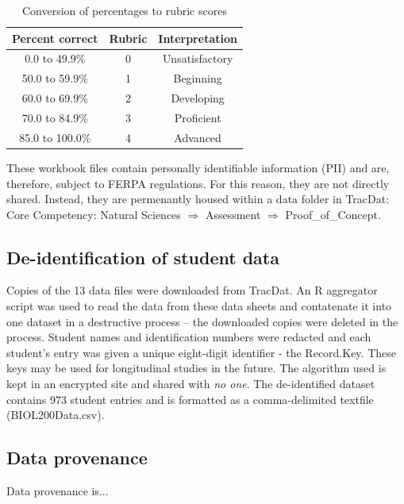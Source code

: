 \documentclass[fleqn,10pt]{SelfArx}\usepackage[]{graphicx}\usepackage[]{color}
\begin{document}
\begin{table}[hbt]
\caption{Conversion of percentages to rubric scores}
\centering
\begin{tabular}{c c c}
\textbf{Percent correct} & \textbf{Rubric} & \textbf{Interpretation}   \\
\hline
 0.0 to 49.9\%   &   0   &   Unsatisfactory                                \\
50.0 to 59.9\%   &   1   &   Beginning                                     \\
60.0 to 69.9\%   &   2   &   Developing                                    \\
70.0 to 84.9\%   &   3   &   Proficient                                    \\
85.0 to 100.0\%  &   4   &   Advanced                                      \\
\end{tabular}
\label{tab:convert}
\end{table}

These workbook files contain personally identifiable information (PII) and are, therefore, subject to FERPA regulations. For this reason, they are not directly shared. Instead, they are permenantly housed within a data folder in TracDat: Core Competency: Natural Sciences $\Rightarrow$ Assessment $\Rightarrow$ Proof\_of\_Concept.

\subsection{De-identification of student data}
Copies of the 13 data files were downloaded from TracDat. An R aggregator script was used to read the data from these data sheets and contatenate it into one dataset in a destructive process -- the downloaded copies were deleted in the process. Student names and identification numbers were redacted and each student's entry was given a unique eight-digit identifier - the Record.Key. These keys may be used for longitudinal studies in the future. The algorithm used is kept in an encrypted site and shared with \textit{no one}. The de-identified dataset contains 973 student entries and is formatted as a comma-delimited textfile (BIOL200Data.csv).

\subsection{Data provenance}
Data provenance is...\citep{Buneman2001}
\end{document}
